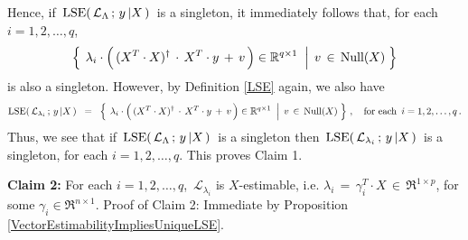 Hence, if \,$\textnormal{LSE}\!\left(\,\mathcal{L}_{\Lambda} \,;\, y\,\vert X\,\right)$\, is a singleton,
it immediately follows that, for each \,$i = 1,2,\ldots,q$,
\begin{equation*}
\left\{\;
	\left.
	\lambda_{i} \cdot \left(\,(X^{T} \cdot X)^{\dagger} \overset{{\color{white}+}}{\cdot} X^{T} \cdot y \, + \, v \,\right)
	\in\Re^{q \times 1}
	\;\;\right\vert\;
	v \,\in\, \Null(X)
\;\right\}
\end{equation*}
is also a singleton.
However, by Definition \ref{LSE} again, we also have
\begin{equation*}
\lse\!\left(\,\mathcal{L}_{\lambda_{i}} \,;\, y\,\vert X\,\right)
\;\;=\;\;
	\left\{\;
		\left.
		\lambda_{i} \cdot \left(\,(X^{T} \cdot X)^{\dagger} \overset{{\color{white}+}}{\cdot} X^{T} \cdot y \, + \, v \,\right)
		\in\Re^{q \times 1}
		\;\;\right\vert\;
		v \,\in\, \Null(X)
	\;\right\}\,,
	\quad
	\textnormal{for each \,$i = 1,2,\ldots,q$}\,.
\end{equation*}
Thus, we see that
if \,$\textnormal{LSE}\!\left(\,\mathcal{L}_{\Lambda} \,;\, y\,\vert X\,\right)$\, is a singleton
then \,$\textnormal{LSE}\!\left(\,\mathcal{L}_{\lambda_{i}} \,;\, y\,\vert X\,\right)$\, is a singleton,
for each $i = 1, 2, \ldots, q$.
This proves Claim 1.

\vskip 0.5cm
\noindent
\textbf{Claim 2:}\quad
For each $i = 1,2,\ldots,q$, \,$\mathcal{L}_{\lambda_{i}}$ is $X$-estimable, 
i.e. $\lambda_{i} \,=\, \gamma_{i}^{T} \cdot X \,\in\, \Re^{1 \times p}$, for some $\gamma_{i} \in \Re^{n \times 1}$.
\vskip 0.2cm
\noindent
Proof of Claim 2:\quad
Immediate by Proposition \ref{VectorEstimabilityImpliesUniqueLSE}.

